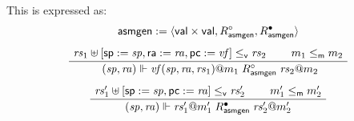 \documentclass[sigplan,screen,review]{acmart}
\newcommand{\kw}[1]{\ensuremath{ \mathsf{#1} }}
\newcommand{\que}{\circ}
\newcommand{\ans}{\bullet}
\newcommand{\vref}{\le_\kw{v}}
\newcommand{\mext}{\le_\kw{m}}
\newenvironment{optional}{}{}
\begin{document}
\begin{optional}

This is expressed as:
\begin{gather*}
  \kw{asmgen} := \langle \kw{val} \times \kw{val},
    R_\kw{asmgen}^\que, R_\kw{asmgen}^\ans \rangle
  \\[1ex]
  \AxiomC{$\mathit{rs}_1 \uplus
    [\kw{sp} := \mathit{sp}, \kw{ra} := \mathit{ra}, \kw{pc} := \mathit{vf}]
    \vref \mathit{rs}_2$}
  \AxiomC{$m_1 \mext m_2$}
  \BinaryInfC{
    $(\mathit{sp}, \mathit{ra}) \Vdash
     \mathit{vf}(\mathit{sp}, \mathit{ra}, \mathit{rs}_1)@m_1
     \mathrel{R_\kw{asmgen}^\que}
     \mathit{rs}_2@m_2$}
  \DisplayProof
  \\[1ex]
  \AxiomC{$
    \mathit{rs}_1' \uplus [\kw{sp} := \mathit{sp}, \kw{pc} := \mathit{ra}]
    \vref \mathit{rs}_2'$}
  \AxiomC{$m_1' \mext m_2'$}
  \BinaryInfC{$
    (\mathit{sp}, \mathit{ra}) \Vdash \mathit{rs}_1'@m_1'
    \mathrel{R_\kw{asmgen}^\ans}
    \mathit{rs}_2'@m_2'$}
  \DisplayProof
\end{gather*}



\end{optional}
\end{document}
